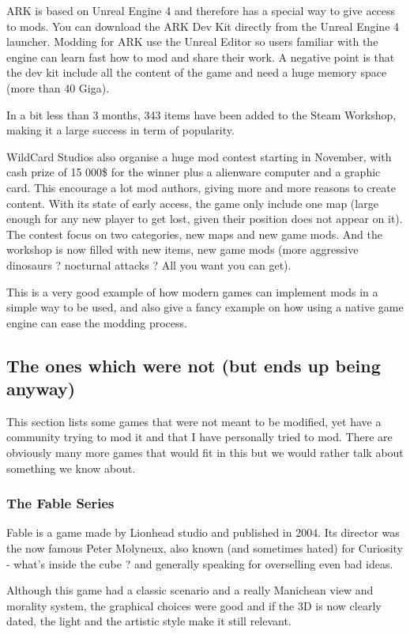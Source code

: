 \documentclass[a4paper,12pt]{article}
\begin{document}
ARK is based on Unreal Engine 4 and therefore has a special way to give access to mods. You can download the ARK Dev Kit directly from the Unreal Engine 4 launcher. Modding for ARK use the Unreal Editor so users familiar with the engine can learn fast how to mod and share their work. A negative point is that the dev kit include all the content of the game and need a huge memory space (more than 40 Giga).

In a bit less than 3 months, 343 items have been added to the Steam Workshop, making it a large success in term of popularity.

WildCard Studios also organise a huge mod contest starting in November, with cash prize of 15 000\$ for the winner plus a alienware computer and a graphic card. This encourage a lot mod authors, giving more and more reasons to create content.
With its state of early access, the game only include one map (large enough for any new player to get lost, given their position does not appear on it). The contest focus on two categories, new maps and new game mods. And the workshop is now filled with new items, new game mods (more aggressive dinosaurs ? nocturnal attacks ? All you want you can get).

This is a very good example of how modern games can implement mods in a simple way to be used, and also give a fancy example on how using a native game engine can ease the modding process.

\subsection{The ones which were not (but ends up being anyway)}

This section lists some games that were not meant to be modified, yet have a community trying to mod it and that I have personally tried to mod. There are obviously many more games that would fit in this but we would rather talk about something we know about.

\subsubsection{The Fable Series}
Fable is a game made by Lionhead studio and published in 2004. Its director was the now famous Peter Molyneux, also known (and sometimes hated) for Curiosity - what's inside the cube ? and generally speaking for overselling even bad ideas.

Although this game had a classic scenario and a really Manichean view and morality system, the graphical choices were good and if the 3D is now clearly dated, the light and the artistic style make it still relevant.
\end{document}
